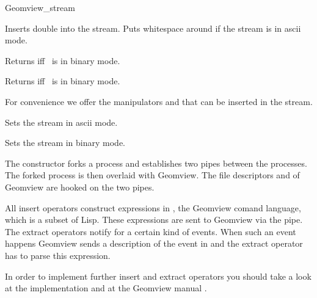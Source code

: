 \begin{ccClass}{Geomview_stream}
\begin{ccAdvanced}
{Inserts double  into the stream. Puts whitespace around if the
stream is in ascii mode.}

{Returns  iff \ccVar\ is in binary mode.}

{Returns  iff \ccVar\ is in binary mode.}


For convenience we offer the manipulators  and 
that can be inserted in the stream.

{Sets the stream in ascii mode.}

{Sets the stream in binary mode.}

\end{ccAdvanced}


\ccImplementation

The constructor forks a process and establishes two pipes between the
processes. The forked process is then overlaid with Geomview. The
file descriptors  and  of Geomview are hooked
on the two pipes.

All insert operators construct expressions in , the Geomview
comand language, which is a subset of {\sc Lisp}. These expressions
are sent to Geomview via the pipe. The extract operators notify 
for a certain kind of events. When such an event happens Geomview
sends a description of the event in  and the extract operator has
to parse this expression.

In order to implement further insert and extract operators you should
take a look at the implementation \cite{f-higso-97} and at the Geomview
manual \cite{p-gmgv16-96}.
\end{ccClass}

